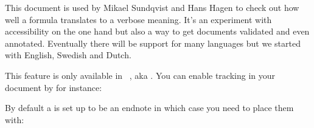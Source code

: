 


\startbuffer [colophon]

\startsubject[title=About this document]

This document is used by Mikael Sundqvist and Hans Hagen to check out how well a
formula translates to a verbose meaning. It's an experiment with accessibility on
the one hand but also a way to get documents validated and even annotated.
Eventually there will be support for many languages but we started with English,
Swedish and Dutch.

\blank

This feature is only available in \CONTEXT\ \MKXL, aka \LMTX. You can enable
tracking in your document by for instance:

\starttyping[option=TEX]
\setuptagging
  [state=start]


\setmathgroupset
  [mydemogroup]

\setupnote
  [mathnote]
  [location=page]

\stoptyping

By default a  is set up to be an endnote in which case you need
to place them with:

\starttyping[option=TEX]
\placenote[mathnode]
\stoptyping

\stopsubject
\stopbuffer

\startdocument
  [title={Meaningfull Math},
   author={Mikael Sundqvist & Hans Hagen}]


\StartExample
\StopExample

\StartExample
\StopExample

\StartExample
\StopExample

\StartExample
\StopExample

\StartExample
\StopExample

\StartExample
\StopExample

